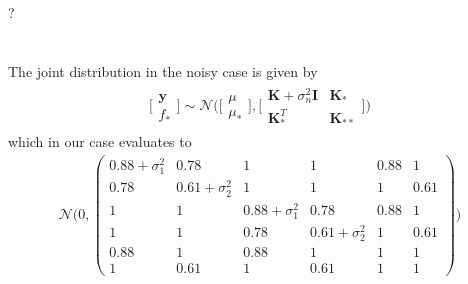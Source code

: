 \documentclass[11pt]{article}
\newcommand{\exercise}{\section{}}
\begin{document}
\exercise
?

\exercise
The joint distribution in the noisy case is given by
\begin{align*}
	\Big[
	\begin{matrix}
		\boldsymbol{y}\\
		f_*
	\end{matrix}
	\Big]
	\sim \mathcal{N} \Big(\Big[
	\begin{matrix}
		\mu\\
		\mu_*
	\end{matrix}
	\Big], \Big[
	\begin{matrix}
		\boldsymbol{K} + \sigma^2_n \boldsymbol{I} & \boldsymbol{K}_* \\
		\boldsymbol{K}^T_* & \boldsymbol{K}_{**}
	\end{matrix}
	\Big]
	\Big)
\end{align*}
which in our case evaluates to
\begin{align*}
	\mathcal N \Big(0,
	\begin{pmatrix}
		0.88 + \sigma^2_1 & 0.78 & 1	& 1	& 0.88 & 1\\
		0.78 & 0.61 + \sigma^2_2 & 1 & 1 & 1 & 0.61\\
		1 & 1 & 0.88 + \sigma^2_1 & 0.78 & 0.88 & 1\\
		1 & 1 & 0.78 & 0.61 + \sigma^2_2 & 1 & 0.61\\
		0.88 & 1 & 0.88 & 1 & 1 & 1\\
		1 & 0.61 & 1 & 0.61 & 1 & 1
	\end{pmatrix}
	\Big)
\end{align*}
\end{document}
